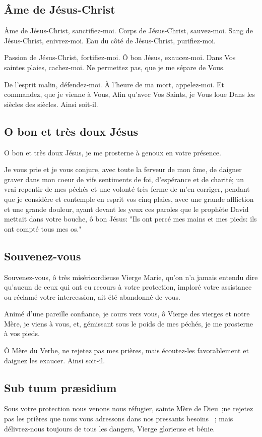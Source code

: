 
\subsection{Âme de Jésus-Christ}

Âme de Jésus-Christ, sanctifiez-moi. Corps de Jésus-Christ, sauvez-moi. Sang de Jésus-Christ, enivrez-moi. Eau du côté de Jésus-Christ, purifiez-moi. 

Passion de Jésus-Christ, fortifiez-moi. Ô bon Jésus, exaucez-moi. Dans Vos saintes plaies, cachez-moi. Ne permettez pas, que je me sépare de Vous. 

De l’esprit malin, défendez-moi. À l’heure de ma mort, appelez-moi. Et commandez, que je vienne à Vous, Afin qu’avec Vos Saints, je Vous loue Dans les siècles des siècles. Ainsi soit-il. 


\subsection{O bon et très doux Jésus}
O bon et très doux Jésus,
je me prosterne à genoux
en votre présence.

Je vous prie
et je vous conjure,
avec toute la ferveur de mon âme,
de daigner graver dans mon coeur
de vifs sentiments de foi,
d'espérance et de charité;
un vrai repentir de mes péchés
et une volonté très ferme
de m'en corriger,
pendant que je considère
et contemple en esprit vos cinq plaies,
avec une grande affliction
et une grande douleur,
ayant devant les yeux
ces paroles que le prophète David
mettait dans votre bouche,
ô bon Jésus:
"Ils ont percé mes mains et mes pieds:
ils ont compté tous mes os."

\subsection{Souvenez-vous}
Souvenez-vous, ô très miséricordieuse Vierge Marie, qu’on n’a jamais entendu dire qu’aucun de ceux qui ont eu recours à votre protection, imploré votre assistance ou réclamé votre intercession, ait été abandonné de vous.

Animé d’une pareille confiance, je cours vers vous, ô Vierge des vierges et notre Mère, je viens à vous, et, gémissant sous le poids de mes péchés, je me prosterne à vos pieds.

Ô Mère du Verbe, ne rejetez pas mes prières, mais écoutez-les favorablement et daignez les exaucer. Ainsi soit-il.

\subsection{Sub tuum præsidium}
%
 {Sous votre protection nous venons nous réfugier, sainte Mère de Dieu~;ne rejetez pas les prières que nous vous adressons dans nos pressants besoins ~; mais délivrez-nous toujours de tous les dangers, Vierge glorieuse et bénie.}